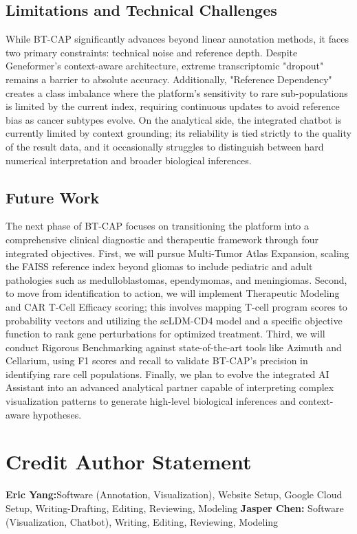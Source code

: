 \documentclass[conference]{IEEEtran}
\begin{document}
\subsection{Limitations and Technical Challenges}
While BT-CAP significantly advances beyond linear annotation methods, it faces two primary constraints: technical noise and reference depth. Despite Geneformer’s context-aware architecture, extreme transcriptomic "dropout" remains a barrier to absolute accuracy. Additionally, "Reference Dependency" creates a class imbalance where the platform’s sensitivity to rare sub-populations is limited by the current index, requiring continuous updates to avoid reference bias as cancer subtypes evolve. On the analytical side, the integrated chatbot is currently limited by context grounding; its reliability is tied strictly to the quality of the result data, and it occasionally struggles to distinguish between hard numerical interpretation and broader biological inferences. 

\subsection{Future Work}
The next phase of BT-CAP focuses on transitioning the platform into a comprehensive clinical diagnostic and therapeutic framework through four integrated objectives. First, we will pursue Multi-Tumor Atlas Expansion, scaling the FAISS reference index beyond gliomas to include pediatric and adult pathologies such as medulloblastomas, ependymomas, and meningiomas. Second, to move from identification to action, we will implement Therapeutic Modeling and CAR T-Cell Efficacy scoring; this involves mapping T-cell program scores to probability vectors and utilizing the scLDM-CD4 model and a specific objective function to rank gene perturbations for optimized treatment. Third, we will conduct Rigorous Benchmarking against state-of-the-art tools like Azimuth and Cellarium, using F1 scores and recall to validate BT-CAP’s precision in identifying rare cell populations. Finally, we plan to evolve the integrated AI Assistant into an advanced analytical partner capable of interpreting complex visualization patterns to generate high-level biological inferences and context-aware hypotheses.

\section{Credit Author Statement}
\textbf{Eric Yang:}Software (Annotation, Visualization), Website Setup, Google Cloud Setup, Writing-Drafting, Editing, Reviewing, Modeling \textbf{Jasper Chen:} Software (Visualization, Chatbot), Writing, Editing, Reviewing, Modeling
\end{document}
